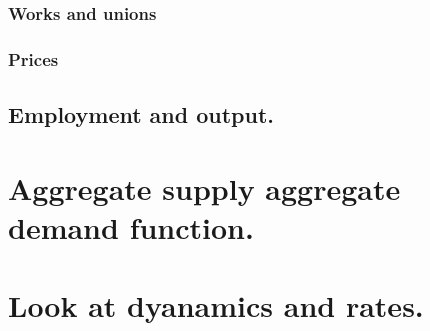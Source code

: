 \documentclass[twocolumn]{article}
\begin{document}
\hypertarget{works-and-unions}{%
\subsubsection{Works and unions}\label{works-and-unions}}

\hypertarget{prices}{%
\subsubsection{Prices}\label{prices}}

\hypertarget{employment-and-output.}{%
\subsection{Employment and output.}\label{employment-and-output.}}

\hypertarget{aggregate-supply-aggregate-demand-function.}{%
\section{Aggregate supply aggregate demand
function.}\label{aggregate-supply-aggregate-demand-function.}}

\hypertarget{look-at-dyanamics-and-rates.}{%
\section{Look at dyanamics and
rates.}\label{look-at-dyanamics-and-rates.}}
\end{document}
